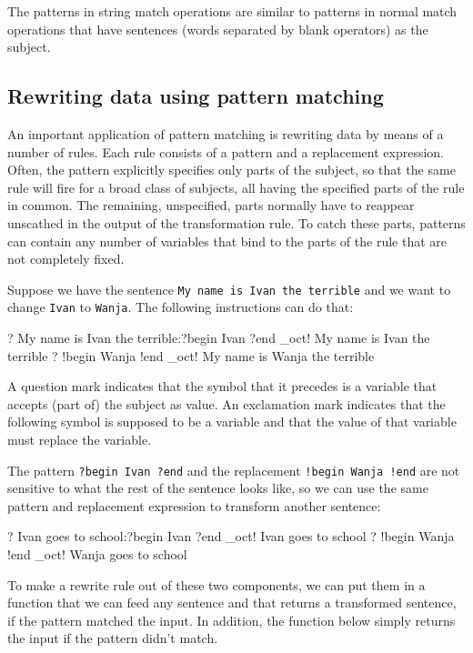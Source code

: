 \documentclass[12pt]{article}
\begin{document}
The patterns in string match operations are similar to patterns in
normal match operations that have sentences (words separated by blank
operators) as the subject.

\subsection{Rewriting data using pattern matching}

An important application of pattern matching is rewriting data by
means of a number of rules. Each rule consists of a pattern and a
replacement expression. Often, the pattern explicitly specifies only
parts of the subject, so that the same rule will fire for a broad
class of subjects, all having the specified parts of the rule in
common. The remaining, unspecified, parts normally have to reappear
unscathed in the output of the transformation rule. To catch these
parts, patterns can contain any number of variables that bind to the
parts of the rule that are not completely fixed.

Suppose we have the sentence \texttt{My name is Ivan the terrible} and
we want to change \texttt{Ivan} to \texttt{Wanja}. The following
instructions can do that:
\begin{ex}
{?} My name is Ivan the terrible:?begin Ivan ?end
_oct{!} My name is Ivan the terrible
{?} !begin Wanja !end
_oct{!} My name is Wanja the terrible
\end{ex}

A question mark indicates that the symbol that it precedes is a
variable that accepts (part of) the subject as value. An exclamation
mark indicates that the following symbol is supposed to be a variable
and that the value of that variable must replace the variable.

The pattern \verb|?begin Ivan ?end| and the replacement
\verb|!begin Wanja !end| are not sensitive to what the rest of the
sentence looks like, so we can use the same pattern and replacement
expression to transform another sentence:
\begin{ex}
{?} Ivan goes to school:?begin Ivan ?end
_oct{!} Ivan goes to school
{?} !begin Wanja !end
_oct{!} Wanja goes to school
\end{ex}

To make a rewrite rule out of these two components, we can put them in
a function that we can feed any sentence and that returns a
transformed sentence, if the pattern matched the input. In addition,
the function below simply returns the input if the pattern didn't
match.
\end{document}
